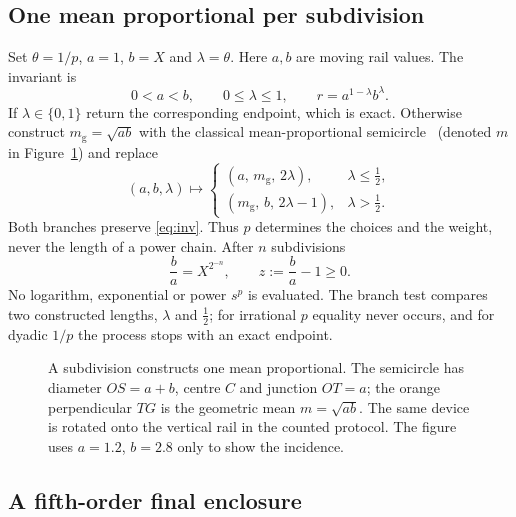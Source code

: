 \subsection{One mean proportional per subdivision}

Set $\theta=1/p$, $a=1$, $b=X$ and $\lambda=\theta$. Here $a,b$ are moving rail values. The invariant is
\begin{equation}\label{eq:inv}
0<a<b,\qquad 0\le\lambda\le1,\qquad r=a^{1-\lambda}b^{\lambda}.
\end{equation}
If $\lambda\in\{0,1\}$ return the corresponding endpoint, which is exact. Otherwise construct
$m_{\mathrm g}=\sqrt{ab}$ with the classical mean-proportional semicircle~\cite{euclid} (denoted $m$ in
Figure~\ref{fig:subdiv}) and replace
\begin{equation}\label{eq:subdiv}
(a,b,\lambda)\longmapsto
\begin{cases}(a,\,m_{\mathrm g},\,2\lambda),&\lambda\le\tfrac12,\\[2pt](m_{\mathrm g},\,b,\,2\lambda-1),&\lambda>\tfrac12.\end{cases}
\end{equation}
Both branches preserve \eqref{eq:inv}. Thus $p$ determines the choices and the weight, never the length
of a power chain. After $n$ subdivisions
\begin{equation}\label{eq:gap}
\frac ba=X^{2^{-n}},\qquad z:=\frac ba-1\ge0.
\end{equation}
No logarithm, exponential or power $s^{p}$ is evaluated. The branch test compares two constructed
lengths, $\lambda$ and $\tfrac12$; for irrational $p$ equality never occurs, and for dyadic $1/p$ the
process stops with an exact endpoint.

\begin{figure}[htbp]
\centering\figSubdivision
\caption{A subdivision constructs one mean proportional. The semicircle has diameter $OS=a+b$, centre
$C$ and junction $OT=a$; the orange perpendicular $TG$ is the geometric mean $m=\sqrt{ab}$. The same
device is rotated onto the vertical rail in the counted protocol. The figure uses $a=1.2$, $b=2.8$ only to
show the incidence.}\label{fig:subdiv}
\end{figure}

\subsection{A fifth-order final enclosure}

